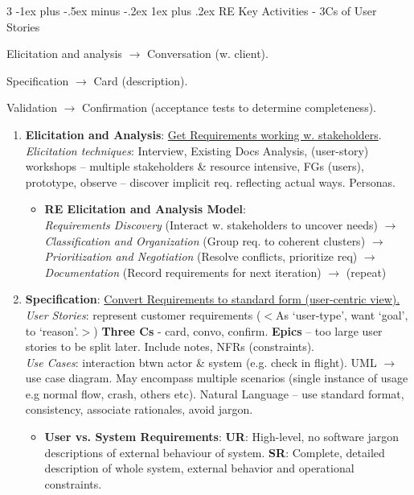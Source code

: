 \documentclass[a4paper, 10pt, landscape]{article}
\makeatletter
\renewcommand{\subsubsection}{\@startsection{subsubsection}{3}{0mm}%
                                {-1ex plus -.5ex minus -.2ex}%
                                {1ex plus .2ex}%
                                {\normalfont\small\bfseries}}
\makeatother
\begin{document}
\begin{multicols*}{3}
\subsubsection{RE Key Activities - 3Cs of User Stories}
\centerline{Elicitation and analysis $\rightarrow$ Conversation (w. client).} 
\centerline{Specification $\rightarrow$ Card (description).}
\centerline{Validation $\rightarrow$ Confirmation (acceptance tests to determine completeness).} \smallskip

 \begin{enumerate}[leftmargin=2mm,labelindent=1mm,labelsep=1mm, itemsep = 0.5pt, before=\justifying]
    \item \textbf{Elicitation and Analysis}: \underline{Get Requirements working w. stakeholders}. \\
    \textit{Elicitation techniques}: Interview, Existing Docs Analysis, (user-story) workshops -- multiple stakeholders \& resource intensive, FGs (users), prototype, observe -- discover implicit req. reflecting actual ways. Personas.
    \begin{itemize}
\item \textbf{RE Elicitation and Analysis Model}: \\
     \textit{Requirements Discovery} (Interact w. stakeholders to uncover needs) $\rightarrow$ 
    \textit{Classification and Organization} (Group req. to coherent clusters) $\rightarrow$
    \textit{Prioritization and Negotiation} (Resolve conflicts, prioritize req) $\rightarrow$
    \textit{Documentation} (Record requirements for next iteration) $\rightarrow$ (repeat)
\end{itemize}
    \item \textbf{Specification}: \underline{Convert Requirements to standard form (user-centric view).} \\
     \textit{User Stories}: represent customer requirements ($<$As `user-type', want `goal', to `reason'.$>$) \textbf{Three Cs} - card, convo, confirm. \textbf{Epics} -- too large user stories to be split later. Include notes, NFRs (constraints). \\
    \textit{Use Cases}: interaction btwn actor \& system (e.g. check in flight). UML $\rightarrow$ use case diagram. May encompass multiple scenarios (single instance of usage e.g normal flow, crash, others etc). Natural Language -- use standard format, consistency, associate rationales, avoid jargon.
    \begin{itemize}
\item \textbf{User vs. System Requirements}: \textbf{UR}: High-level, no software jargon descriptions of external behaviour of system. \textbf{SR}: Complete, detailed description of whole system, external behavior and operational constraints.

\end{itemize}
\end{enumerate}
\end{multicols*}
\end{document}
